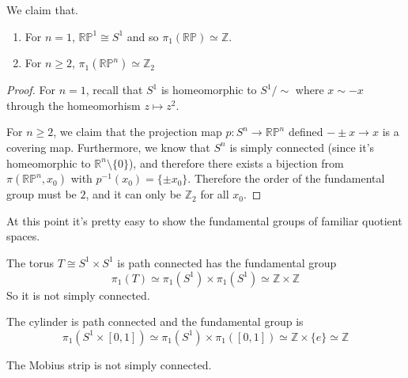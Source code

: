  \begin{theorem}
    We claim that. 
    \begin{enumerate}
      \item For $n = 1$, $\mathbb{RP}^1 \cong S^1$ and so $\pi_1(\mathbb{RP}) \simeq \mathbb{Z}$. 
      \item For $n \geq 2$, $\pi_1 (\mathbb{RP}^n) \simeq \mathbb{Z}_2$
    \end{enumerate}
  \end{theorem}
  \begin{proof}
    For $n = 1$, recall that $S^1$ is homeomorphic to $S^1/{\sim}$ where $x \sim -x$ through the homeomorhism $z \mapsto z^2$. 

    For $n \geq 2$, we claim that the projection map $p: S^n \to \mathbb{RP}^n$ defined $-\pm x \to x$ is a covering map. Furthermore, we know that $S^n$ is simply connected (since it's homeomorphic to $\mathbb{R}^n \setminus \{0\}$), and therefore there exists a bijection from $\pi(\mathbb{RP}^n, x_0)$ with $p^{-1} (x_0) = \{\pm x_0\}$. Therefore the order of the fundamental group must be $2$, and it can only be $\mathbb{Z}_2$ for all $x_0$. 
  \end{proof}

  At this point it's pretty easy to show the fundamental groups of familiar quotient spaces. 

  \begin{example}[Torus]
    The torus $T \cong S^1 \times S^1$ is path connected has the fundamental group 
    \begin{equation}
      \pi_1 (T) \simeq \pi_1 (S^1) \times \pi_1 (S^1) \simeq \mathbb{Z} \times \mathbb{Z}
    \end{equation}
    So it is not simply connected. 
  \end{example}

  \begin{example}[Cylinder]
    The cylinder is path connected and the fundamental group is 
    \begin{equation}
      \pi_1 (S^1 \times [0, 1]) \simeq \pi_1 (S^1) \times \pi_1 ([0, 1]) \simeq \mathbb{Z} \times \{e\} \simeq \mathbb{Z} 
    \end{equation}
  \end{example}

  \begin{example}
    The Mobius strip is not simply connected. 
  \end{example}

